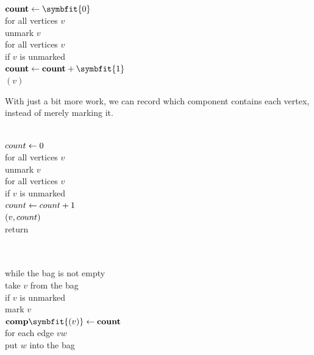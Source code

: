 \begin{pseudocode}
\\
\mbox{\color{JEred}$\mbox{\bfseries \Var{count}} \gets \symbfit{0}$}\\
for all vertices $v$\\
\Indent unmark $v$\\
for all vertices $v$\\
\Indent if $v$ is unmarked\\
\Indent\Indent \mbox{\color{JEred}$\mbox{\bfseries \Var{count}} \gets \mbox{\bfseries \Var{count}} + \symbfit{1}$}\\
\Indent\Indent {}$(v)$\\
\mbox{}
\end{pseudocode}
\noindent With just a bit more work, we can record which component contains each vertex, instead of merely marking it.

\begin{center}
\begin{minipage}[c]{0.45\linewidth}
\begin{pseudocode}
\\
$count \gets 0$\\
for all vertices $v$\\
\Indent unmark $v$\\
for all vertices $v$\\
\Indent if $v$ is unmarked\\
\Indent\Indent $count \gets count + 1$\\
\Indent\Indent {}$(v, count)$\\
return 
\end{pseudocode}
\end{minipage}\hfill
\begin{minipage}[c]{0.5\linewidth}
\begin{pseudocode}
\\
\\
while the bag is not empty\\
\Indent take $v$ from the bag\\
\Indent if $v$ is unmarked\\
\Indent\Indent mark $v$\\
\Indent\Indent \mbox{\color{JEred}$\mbox{\bfseries \Var{comp}}\symbfit{(v)} \gets \mbox{\bfseries \Var{count}}$}\\
\Indent\Indent for each edge $vw$\\
\Indent\Indent\Indent put $w$ into the bag
\end{pseudocode}
\end{minipage}
\end{center}

